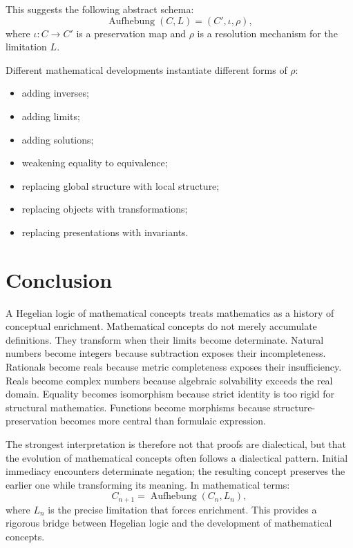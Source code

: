 \documentclass[11pt]{article}
\begin{document}
This suggests the following abstract schema:
\[
\operatorname{Aufhebung}(C,L)
= (C',\iota,\rho),
\]
where $\iota:C\to C'$ is a preservation map and $\rho$ is a resolution mechanism for the limitation $L$.

Different mathematical developments instantiate different forms of $\rho$:
\begin{itemize}
    \item adding inverses;
    \item adding limits;
    \item adding solutions;
    \item weakening equality to equivalence;
    \item replacing global structure with local structure;
    \item replacing objects with transformations;
    \item replacing presentations with invariants.
\end{itemize}

\section{Conclusion}

A Hegelian logic of mathematical concepts treats mathematics as a history of conceptual enrichment. Mathematical concepts do not merely accumulate definitions. They transform when their limits become determinate. Natural numbers become integers because subtraction exposes their incompleteness. Rationals become reals because metric completeness exposes their insufficiency. Reals become complex numbers because algebraic solvability exceeds the real domain. Equality becomes isomorphism because strict identity is too rigid for structural mathematics. Functions become morphisms because structure-preservation becomes more central than formulaic expression.

The strongest interpretation is therefore not that proofs are dialectical, but that the evolution of mathematical concepts often follows a dialectical pattern. Initial immediacy encounters determinate negation; the resulting concept preserves the earlier one while transforming its meaning. In mathematical terms:
\[
C_{n+1}=\operatorname{Aufhebung}(C_n,L_n),
\]
where $L_n$ is the precise limitation that forces enrichment. This provides a rigorous bridge between Hegelian logic and the development of mathematical concepts.
\end{document}
